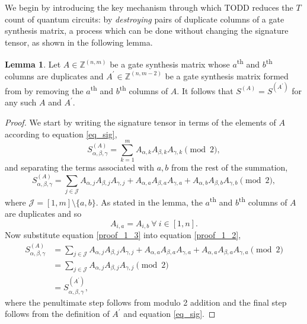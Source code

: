 \documentclass[notitlepage]{article}
\theoremstyle{definition}
\theoremstyle{problem}
\theoremstyle{lemma}
\newtheorem{lemma}{Lemma}[section]
\begin{document}
We begin by introducing the key mechanism through which TODD reduces the $T$ count of quantum circuits: by \emph{destroying} pairs of duplicate columns of a gate synthesis matrix, a process which can be done without changing the signature tensor, as shown in the following lemma.
\theoremstyle{Lemma}
\begin{lemma}{}
	\label{lemma_1}
	Let $A\in \mathbb{Z}^{(n,m)}$ be a gate synthesis matrix whose $a$\textsuperscript{th} and $b$\textsuperscript{th} columns are duplicates and $A^\prime\in \mathbb{Z}^{(n,m-2)}$ be a gate synthesis matrix formed from by removing the $a$\textsuperscript{th} and $b$\textsuperscript{th} columns of $A$. It follows that $S^{(A)}=S^{(A^\prime)}$ for any such $A$ and $A^\prime$.
\end{lemma}
\begin{proof}
	We start by writing the signature tensor in terms of the elements of $A$ according to equation \ref{eq_sig},
	\begin{equation}
	S^{(A)}_{\alpha,\beta,\gamma} = \sum_{k=1}^{m}A_{\alpha,k}A_{\beta,k}A_{\gamma,k} \pmod{2},
	\end{equation}
	and separating the terms associated with $a,b$ from the rest of the summation,
	\begin{equation}
	\label{proof_1_2}
	S^{(A)}_{\alpha,\beta,\gamma} = \sum_{j\in \mathcal{J}}A_{\alpha,j}A_{\beta,j}A_{\gamma,j} + A_{\alpha,a}A_{\beta,a}A_{\gamma,a} + A_{\alpha,b}A_{\beta,b}A_{\gamma,b} \pmod{2},
	\end{equation}
	where $\mathcal{J} = \left[1,m\right]\setminus \{a, b\}$.
	As stated in the lemma, the $a$\textsuperscript{th} and $b$\textsuperscript{th} columns of $A$ are duplicates and so
	\begin{equation}
		\label{proof_1_3}
		A_{i,a} = A_{i,b}\ \forall\ i \in \left[1,n\right].
	\end{equation}
	Now substitute equation \ref{proof_1_3} into equation \ref{proof_1_2},
	\begin{align}
	S^{(A)}_{\alpha,\beta,\gamma} &= \sum_{j\in \mathcal{J}}A_{\alpha,j}A_{\beta,j}A_{\gamma,j} + A_{\alpha,a}A_{\beta,a}A_{\gamma,a} + A_{\alpha,a}A_{\beta,a}A_{\gamma,a} \pmod{2}\\
	&= \sum_{j\in \mathcal{J}}A_{\alpha,j}A_{\beta,j}A_{\gamma,j} \pmod{2}\\
	&= S^{(A^\prime)}_{\alpha,\beta,\gamma},
	\end{align}
	where the penultimate step follows from modulo 2 addition and the final step follows from the definition of $A^\prime$ and equation \ref{eq_sig}.
\end{proof}
\end{document}
